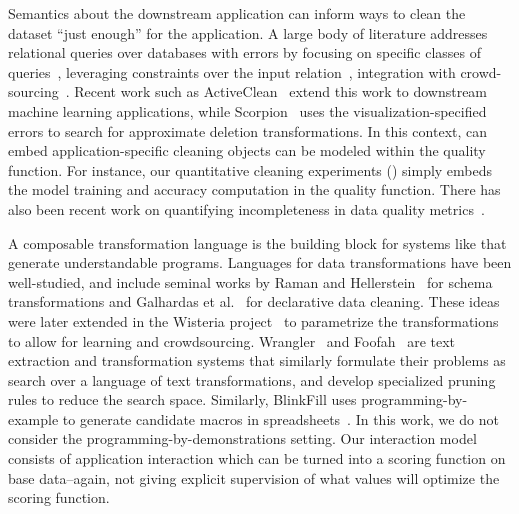 Semantics about the downstream application can inform ways to clean the dataset ``just enough'' for the application.  
A large body of literature addresses relational queries over databases with errors by focusing on specific classes of queries~\cite{altwaijry2015query}, leveraging constraints over the input relation~\cite{2011Bertossi}, integration with crowd-sourcing~\cite{DBLP:conf/sigmod/BergmanMNT15}.   Recent work such as ActiveClean~\cite{DBLP:journals/pvldb/KrishnanWWFG16} extend this work to downstream machine learning applications, while Scorpion~\cite{DBLP:journals/pvldb/0002M13} uses the visualization-specified errors to search for approximate deletion transformations.   In this context, \sys can embed application-specific cleaning objects can be modeled within the quality function.  For instance, our quantitative cleaning experiments () simply embeds the model training and accuracy computation in the quality function. 
There has also been recent work on quantifying incompleteness in data quality metrics~\cite{chung2016data}.


 A composable transformation language is the building block for systems like \sys that generate understandable programs.   Languages for data transformations have been well-studied, and include seminal works by Raman and Hellerstein~\cite{raman2001potter} for schema transformations and Galhardas et al.~\cite{DBLP:conf/vldb/GalhardasFSSS01} for declarative data cleaning. These ideas were later extended in the Wisteria project~\cite{DBLP:journals/pvldb/HaasKWF015} to parametrize the transformations to allow for learning and crowdsourcing.   Wrangler~\cite{wrangler} and Foofah~\cite{jin2017foofah} are text extraction and transformation systems that similarly formulate their problems as search over a language of text transformations, and develop specialized pruning rules to reduce the search space. Similarly, BlinkFill uses programming-by-example to generate candidate macros in spreadsheets~\cite{singh2016blinkfill}. In this work, we do not consider the programming-by-demonstrations setting. Our interaction model consists of application interaction which can be turned into a scoring function on base data--again, not giving explicit supervision of what values will optimize the scoring function.


